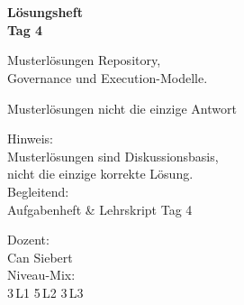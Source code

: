 \documentclass[11pt,a4paper,oneside]{article}
\begin{document}
\begin{titlepage}
  \pagestyle{empty}
  \vspace*{1.5cm}
  \\[2pt]
  \noindent{\color{lpAccent}\rule{\linewidth}{1.2pt}}\\[4pt]

  \vspace{3cm}
  {\sffamily\fontsize{30}{34}\selectfont\bfseries\color{lpInk}L\"osungsheft\\Tag 4\par}

  \vspace{0.7cm}
  {\sffamily\large\color{lpGray}Musterl\"osungen \textendash{} Repository,\\Governance und Execution-Modelle.\par}

  \vspace{1.5cm}
  {\caveatfont\LARGE\color{lpGreen}Musterl\"osungen \textperiodcentered{} nicht die einzige Antwort}\par

  \vfill

  \noindent\begin{minipage}{0.55\linewidth}
    {\sffamily\footnotesize\color{lpGray}Hinweis:}\\
    {\sffamily\small\color{lpInk}Musterl\"osungen sind Diskussionsbasis,\\nicht die einzige korrekte L\"osung.}\\[10pt]
    {\sffamily\footnotesize\color{lpGray}Begleitend:}\\
    {\sffamily\small\color{lpInk}Aufgabenheft \& Lehrskript Tag 4}
  \end{minipage}\hfill
  \begin{minipage}{0.4\linewidth}
    \raggedleft
    {\sffamily\footnotesize\color{lpGray}Dozent:}\\
    {\sffamily\small\color{lpInk}Can Siebert}\\[10pt]
    {\sffamily\footnotesize\color{lpGray}Niveau-Mix:}\\
    {\sffamily\small\color{lpInk}3\,L1 \textperiodcentered{} 5\,L2 \textperiodcentered{} 3\,L3}
  \end{minipage}

  \vspace{0.5cm}
  \noindent{\color{lpAccent}\rule{\linewidth}{0.6pt}}
\end{titlepage}
\end{document}
